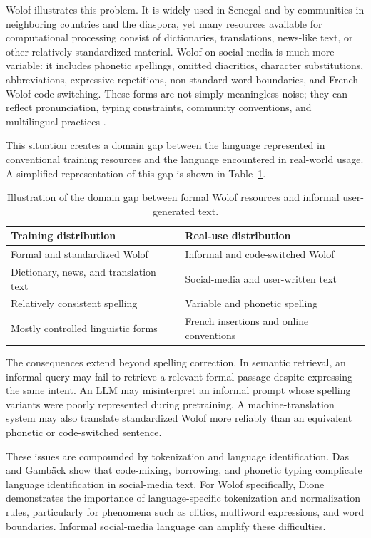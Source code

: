 \documentclass[12pt, a4paper, twoside, openany]{report}
\begin{document}
Wolof illustrates this problem. It is widely used in Senegal and by communities in neighboring countries and the diaspora, yet many resources available for computational processing consist of dictionaries, translations, news-like text, or other relatively standardized material. Wolof on social media is much more variable: it includes phonetic spellings, omitted diacritics, character substitutions, abbreviations, expressive repetitions, non-standard word boundaries, and French--Wolof code-switching. These forms are not simply meaningless noise; they can reflect pronunciation, typing constraints, community conventions, and multilingual practices \cite{alsharou2021noise}.

This situation creates a domain gap between the language represented in conventional training resources and the language encountered in real-world usage. A simplified representation of this gap is shown in Table~\ref{tab:domain-gap}.

\begin{table}[H]
	\centering
	\caption{Illustration of the domain gap between formal Wolof resources and informal user-generated text.}
	\label{tab:domain-gap}
	\begin{tabularx}{\textwidth}{>{\raggedright\arraybackslash}X >{\raggedright\arraybackslash}X}
		\toprule
		\textbf{Training distribution} & \textbf{Real-use distribution} \\
		\midrule
		Formal and standardized Wolof & Informal and code-switched Wolof \\
		Dictionary, news, and translation text & Social-media and user-written text \\
		Relatively consistent spelling & Variable and phonetic spelling \\
		Mostly controlled linguistic forms & French insertions and online conventions \\
		\bottomrule
	\end{tabularx}
\end{table}

The consequences extend beyond spelling correction. In semantic retrieval, an informal query may fail to retrieve a relevant formal passage despite expressing the same intent. An \ac{LLM} may misinterpret an informal prompt whose spelling variants were poorly represented during pretraining. A machine-translation system may also translate standardized Wolof more reliably than an equivalent phonetic or code-switched sentence.

These issues are compounded by tokenization and language identification. Das and Gamb{\"a}ck \cite{das2013codemixing} show that code-mixing, borrowing, and phonetic typing complicate language identification in social-media text. For Wolof specifically, Dione \cite{dione2017tokenization} demonstrates the importance of language-specific tokenization and normalization rules, particularly for phenomena such as clitics, multiword expressions, and word boundaries. Informal social-media language can amplify these difficulties.
\end{document}
